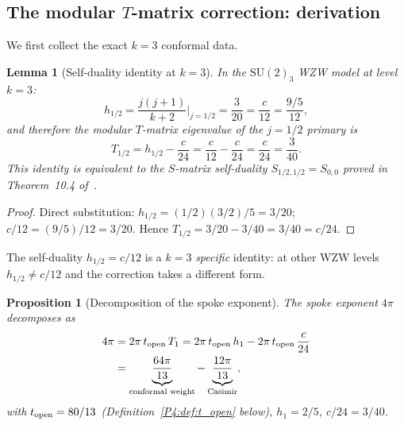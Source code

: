 \documentclass[11pt,a4paper]{article}
\newtheorem{lemma}[theorem]{Lemma}
\newtheorem{proposition}[theorem]{Proposition}
\theoremstyle{definition}
\theoremstyle{remark}
\begin{document}
\subsection{The modular $T$-matrix correction: derivation}
\label{P4:sec:t_matrix_derivation}

We first collect the exact $k=3$ conformal data.

\begin{lemma}[Self-duality identity at $k=3$]
\label{P4:lem:self_dual}
In the $\mathrm{SU}(2)_3$ WZW model at level $k=3$:
\begin{equation}
  h_{1/2} = \frac{j(j+1)}{k+2}\bigg|_{j=1/2} = \frac{3}{20}
  = \frac{c}{12} = \frac{9/5}{12},
  \label{P4:eq:h12_c12}
\end{equation}
and therefore the modular $T$-matrix eigenvalue of the $j=1/2$ primary is
\begin{equation}
  T_{1/2}
  = h_{1/2} - \frac{c}{24}
  = \frac{c}{12} - \frac{c}{24}
  = \frac{c}{24}
  = \frac{3}{40}.
  \label{P4:eq:T12_val}
\end{equation}
This identity is equivalent to the $S$-matrix self-duality
$S_{1/2,1/2}=S_{0,0}$ proved in Theorem~10.4 of~\cite{Paper3}.
\end{lemma}

\begin{proof}
Direct substitution: $h_{1/2}=(1/2)(3/2)/5=3/20$; $c/12=(9/5)/12=3/20$.
Hence $T_{1/2}=3/20-3/40=3/40=c/24$.
\end{proof}

The self-duality $h_{1/2}=c/12$ is a $k=3$ \emph{specific} identity: at
other WZW levels $h_{1/2}\neq c/12$ and the correction takes a different form.

\begin{proposition}[Decomposition of the spoke exponent]
\label{P4:prop:exponent_decomp}
The spoke exponent $4\pi$ decomposes as
\begin{align}
  4\pi
  &= 2\pi\,t_{\rm open}\,T_1
   = 2\pi\,t_{\rm open}\,h_1
     - 2\pi\,t_{\rm open}\,\frac{c}{24} \notag\\
  &= \underbrace{\frac{64\pi}{13}}_{\text{conformal weight}}
     - \underbrace{\frac{12\pi}{13}}_{\text{Casimir}},
  \label{P4:eq:exponent_decomp}
\end{align}
with $t_{\rm open}=80/13$ (Definition~\ref{P4:def:t_open} below),
$h_1=2/5$, $c/24=3/40$.
\end{proposition}
\end{document}
